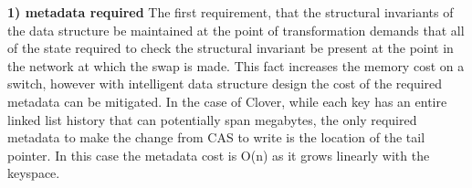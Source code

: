 \textbf{1) metadata required} The first requirement, that the structural invariants
of the data structure be maintained at the point of transformation demands that
all of the state required to check the structural invariant be present at the
point in the network at which the swap is made. This fact increases the memory
cost on a switch, however with intelligent data structure design the cost of the
required metadata can be mitigated. In the case of Clover, while each key has
an entire linked list history that can potentially span megabytes, the only
required metadata to make the change from CAS to write is the location of the
tail pointer. In this case the metadata cost is O(n) as it grows linearly with
the keyspace.





